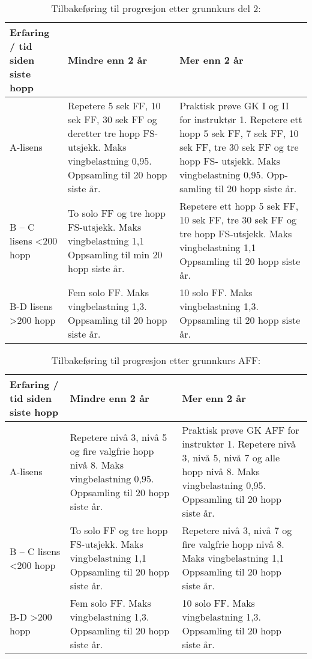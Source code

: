 \begin{table}
	\caption{Tilbakeføring til progresjon etter grunnkurs del 2:}
	\begin{tabular}{ | p{2cm} | p{4cm} | p{4cm} | }
		\hline
		Erfaring / tid siden siste hopp & Mindre enn 2 år & Mer enn 2 år \\
		\hline
		A-lisens & Repetere 5 sek FF, 10 sek FF, 30 sek FF og deretter tre hopp FS-utsjekk. Maks vingbelastning 0,95. Oppsamling til 20 hopp siste år. & Praktisk prøve GK I og II for instruktør 1. Repetere ett hopp 5 sek FF, 7 sek FF, 10 sek FF, tre 30 sek FF og tre hopp FS- utsjekk. Maks vingbelastning 0,95. Opp- samling til 20 hopp siste år. \\
		\hline
		B – C lisens \textless 200 hopp & To solo FF og tre hopp FS-utsjekk. Maks vingbelastning 1,1 Oppsamling til min 20 hopp siste år. & Repetere ett hopp 5 sek FF, 10 sek FF, tre 30 sek FF og tre hopp FS-utsjekk. Maks vingbelastning 1,1 Oppsamling til 20 hopp siste år. \\
		\hline
		B-D lisens \textgreater 200 hopp & Fem solo FF. Maks vingbelastning 1,3. Oppsamling til 20 hopp siste år. & 10 solo FF. Maks vingbelastning 1,3. Oppsamling til 20 hopp siste år. \\
		\hline
	\end{tabular}
\end{table}

\begin{table}
	\caption{Tilbakeføring til progresjon etter grunnkurs AFF:}
	\begin{tabular}{ | p{2cm} | p{4cm} | p{4cm} | }
		\hline
		Erfaring / tid siden siste hopp & Mindre enn 2 år & Mer enn 2 år \\
		\hline
		A-lisens & Repetere nivå 3, nivå 5 og fire valgfrie hopp nivå 8. Maks vingbelastning 0,95. Oppsamling til 20 hopp siste år. & Praktisk prøve GK AFF for instruktør 1. Repetere nivå 3, nivå 5, nivå 7 og alle hopp nivå 8. Maks vingbelastning 0,95. Oppsamling til 20 hopp siste år. \\
		\hline
		B – C lisens \textless 200 hopp & To solo FF og tre hopp FS-utsjekk. Maks vingbelastning 1,1 Oppsamling til 20 hopp siste år. & Repetere nivå 3, nivå 7 og fire valgfrie hopp nivå 8. Maks vingbelastning 1,1 Oppsamling til 20 hopp siste år. \\
		\hline
		B-D \textgreater 200 hopp & Fem solo FF. Maks vingbelastning 1,3. Oppsamling til 20 hopp siste år. & 10 solo FF. Maks vingbelastning 1,3. Oppsamling til 20 hopp siste år. \\
		\hline
	\end{tabular}
\end{table}


